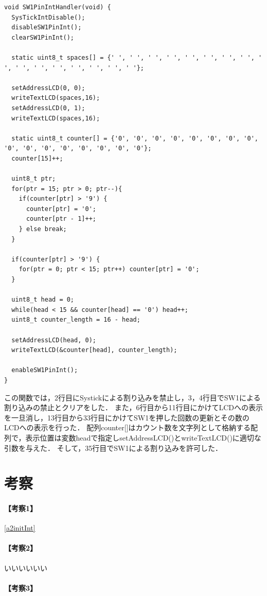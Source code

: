 \documentclass{jlreq}
\begin{document}
\begin{lstlisting}[label=a5counter,caption={【課題5】におけるSW1PinIntHandler関数}]
void SW1PinIntHandler(void) {
  SysTickIntDisable();
  disableSW1PinInt();
  clearSW1PinInt();

  static uint8_t spaces[] = {' ', ' ', ' ', ' ', ' ', ' ', ' ', ' ', ' ', ' ', ' ', ' ', ' ', ' ', ' ', ' '};

  setAddressLCD(0, 0);
  writeTextLCD(spaces,16);
  setAddressLCD(0, 1);
  writeTextLCD(spaces,16);

  static uint8_t counter[] = {'0', '0', '0', '0', '0', '0', '0', '0', '0', '0', '0', '0', '0', '0', '0', '0'};
  counter[15]++;

  uint8_t ptr;
  for(ptr = 15; ptr > 0; ptr--){
    if(counter[ptr] > '9') {
      counter[ptr] = '0';
      counter[ptr - 1]++;
    } else break;
  }

  if(counter[ptr] > '9') {
    for(ptr = 0; ptr < 15; ptr++) counter[ptr] = '0';
  }

  uint8_t head = 0;
  while(head < 15 && counter[head] == '0') head++;
  uint8_t counter_length = 16 - head;

  setAddressLCD(head, 0);
  writeTextLCD(&counter[head], counter_length);

  enableSW1PinInt();
}
\end{lstlisting}

この関数では，2行目にSystickによる割り込みを禁止し，3，4行目でSW1による割り込みの禁止とクリアをした．
また，6行目から11行目にかけてLCDへの表示を一旦消し，13行目から33行目にかけてSW1を押した回数の更新とその数のLCDへの表示を行った．
配列counter[]はカウント数を文字列として格納する配列で，表示位置は変数headで指定しsetAddressLCD()とwriteTextLCD()に適切な引数を与えた．
そして，35行目でSW1による割り込みを許可した．

\section{考察}
\paragraph{【考察1】}\ref{a2initInt}
\paragraph{【考察2】}いいいいいい
\paragraph{【考察3】}
\end{document}
